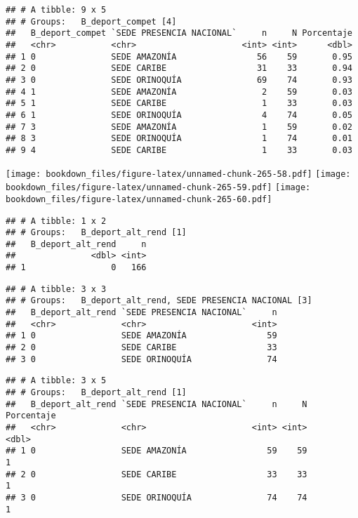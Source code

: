 \documentclass[]{article}
\theoremstyle{definition}
\theoremstyle{definition}
\theoremstyle{definition}
\theoremstyle{remark}
\begin{document}
\begin{verbatim}
## # A tibble: 9 x 5
## # Groups:   B_deport_compet [4]
##   B_deport_compet `SEDE PRESENCIA NACIONAL`     n     N Porcentaje
##   <chr>           <chr>                     <int> <int>      <dbl>
## 1 0               SEDE AMAZONÍA                56    59       0.95
## 2 0               SEDE CARIBE                  31    33       0.94
## 3 0               SEDE ORINOQUÍA               69    74       0.93
## 4 1               SEDE AMAZONÍA                 2    59       0.03
## 5 1               SEDE CARIBE                   1    33       0.03
## 6 1               SEDE ORINOQUÍA                4    74       0.05
## 7 3               SEDE AMAZONÍA                 1    59       0.02
## 8 3               SEDE ORINOQUÍA                1    74       0.01
## 9 4               SEDE CARIBE                   1    33       0.03
\end{verbatim}

\texttt{[image: bookdown\_files/figure-latex/unnamed-chunk-265-58.pdf]}
\texttt{[image: bookdown\_files/figure-latex/unnamed-chunk-265-59.pdf]}
\texttt{[image: bookdown\_files/figure-latex/unnamed-chunk-265-60.pdf]}

\begin{verbatim}
## # A tibble: 1 x 2
## # Groups:   B_deport_alt_rend [1]
##   B_deport_alt_rend     n
##               <dbl> <int>
## 1                 0   166
\end{verbatim}

\begin{verbatim}
## # A tibble: 3 x 3
## # Groups:   B_deport_alt_rend, SEDE PRESENCIA NACIONAL [3]
##   B_deport_alt_rend `SEDE PRESENCIA NACIONAL`     n
##   <chr>             <chr>                     <int>
## 1 0                 SEDE AMAZONÍA                59
## 2 0                 SEDE CARIBE                  33
## 3 0                 SEDE ORINOQUÍA               74
\end{verbatim}

\begin{verbatim}
## # A tibble: 3 x 5
## # Groups:   B_deport_alt_rend [1]
##   B_deport_alt_rend `SEDE PRESENCIA NACIONAL`     n     N Porcentaje
##   <chr>             <chr>                     <int> <int>      <dbl>
## 1 0                 SEDE AMAZONÍA                59    59          1
## 2 0                 SEDE CARIBE                  33    33          1
## 3 0                 SEDE ORINOQUÍA               74    74          1
\end{verbatim}
\end{document}

